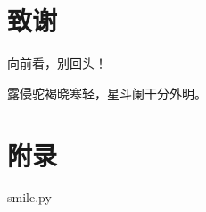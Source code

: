 



\chapter*{\sanhao\heiti\textbf{致\qquad 谢}}

向前看，别回头！

露侵驼褐晓寒轻，星斗阑干分外明。




\chapter*{\sanhao\heiti\textbf{附\qquad 录}}

smile.py




